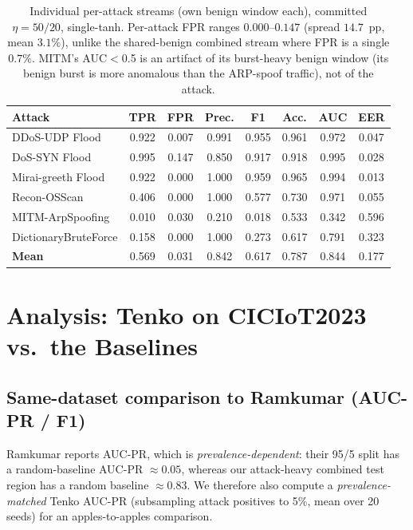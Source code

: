 \documentclass[10pt]{article}
\begin{document}
\begin{table}[h]
\centering
\caption{Individual per-attack streams (own benign window each), committed $\eta{=}50/20$,
single-tanh. Per-attack FPR ranges $0.000$--$0.147$ (spread $14.7$~pp, mean $3.1\%$), unlike
the shared-benign combined stream where FPR is a single $0.7\%$. MITM's AUC$<$0.5 is an
artifact of its burst-heavy benign window (its benign burst is more anomalous than the
ARP-spoof traffic), not of the attack.}
\label{tab:indiv}
\begin{tabular}{l ccccc cc}
\toprule
\textbf{Attack} & \textbf{TPR} & \textbf{FPR} & \textbf{Prec.} & \textbf{F1} & \textbf{Acc.} & \textbf{AUC} & \textbf{EER} \\
\midrule
DDoS-UDP Flood       & 0.922 & 0.007 & 0.991 & 0.955 & 0.961 & 0.972 & 0.047 \\
DoS-SYN Flood        & 0.995 & 0.147 & 0.850 & 0.917 & 0.918 & 0.995 & 0.028 \\
Mirai-greeth Flood   & 0.922 & 0.000 & 1.000 & 0.959 & 0.965 & 0.994 & 0.013 \\
Recon-OSScan         & 0.406 & 0.000 & 1.000 & 0.577 & 0.730 & 0.971 & 0.055 \\
MITM-ArpSpoofing     & 0.010 & 0.030 & 0.210 & 0.018 & 0.533 & 0.342 & 0.596 \\
DictionaryBruteForce & 0.158 & 0.000 & 1.000 & 0.273 & 0.617 & 0.791 & 0.323 \\
\midrule
\textbf{Mean}        & 0.569 & 0.031 & 0.842 & 0.617 & 0.787 & 0.844 & 0.177 \\
\bottomrule
\end{tabular}
\end{table}

\section{Analysis: Tenko on CICIoT2023 vs.\ the Baselines}
\label{sec:analysis}

\subsection{Same-dataset comparison to Ramkumar (AUC-PR / F1)}
Ramkumar reports AUC-PR, which is \emph{prevalence-dependent}: their 95/5 split has a
random-baseline AUC-PR $\approx0.05$, whereas our attack-heavy combined test region has a
random baseline $\approx0.83$. We therefore also compute a \emph{prevalence-matched} Tenko
AUC-PR (subsampling attack positives to 5\%, mean over 20 seeds) for an apples-to-apples
comparison.
\end{document}
